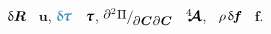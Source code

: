 \noindent {} ${\updelta\hspace{-0.1ex}\bm{R}}$ ~$\bm{u}$, $\varbivalent{\hspace{-0.2ex}\cauchystress}$ ~$\mathboldtau$, ${\scalebox{0.98}[1]{$\raisemath{0.16em}{\scalebox{0.92}[0.92]{$\partial^2 \hspace{0.1ex} \Pi$}} / \hspace{-0.1ex} \raisemath{-0.32em}{\scalebox{0.92}[0.92]{$\partial \hspace{0.1ex} \bm{C} \hspace{0.1ex} \partial \hspace{0.1ex} \bm{C}$}}\hspace{0.12ex}$}}$ ~$\hspace{.08ex}{^4\hspace{-0.72ex}\bm{\mathcal{A}}}\hspace{.08ex}$, ~${\rho \hspace{.25ex} \variation{\hspace{-0.2ex}\bm{f}}}$ ~$\bm{f}$\hbox{\hspace{-0.2ex}.}

